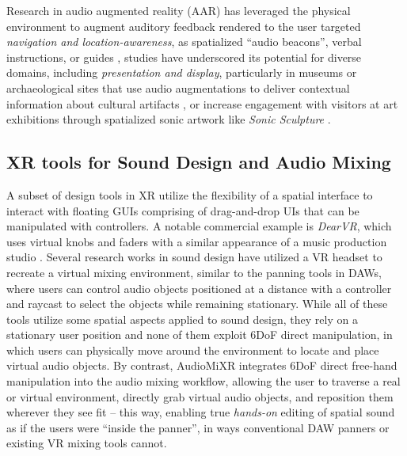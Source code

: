 Research in audio augmented reality (AAR) has leveraged the physical environment to augment auditory feedback rendered to the user targeted \emph{navigation and location-awareness}, as spatialized \enquote{audio beacons}, verbal instructions, or guides \cite{zoo_guide_2007, audio_stickies_2013}, studies have underscored its potential for diverse domains, including  \emph{presentation and display}, particularly in museums or archaeological sites that use audio augmentations to deliver contextual information about cultural artifacts \cite{Hatala2005, archeological2012}, or increase engagement with visitors at art exhibitions through spatialized sonic artwork like \emph{Sonic Sculpture} \cite{martin2020sonic}. 

\subsection{XR tools for Sound Design and Audio Mixing}
 A subset of design tools in XR utilize the flexibility of a spatial interface to interact with floating GUIs comprising of drag-and-drop UIs that can be manipulated with controllers. A notable commercial example is \emph{DearVR}, which uses virtual knobs and faders with a similar appearance of a music production studio \cite{dearvr2024}. Several research works in sound design \cite{jiang2023spatializing,bargum2023spatial} have utilized a VR headset to recreate a virtual mixing environment, similar to the panning tools in DAWs, where users can control audio objects positioned at a distance with a controller and raycast to select the objects while remaining stationary.%
 While all of these tools utilize some spatial aspects applied to sound design, they rely on a stationary user position and none of them exploit 6DoF direct manipulation, in which users can physically move around the environment to locate and place virtual audio objects. 
By contrast, AudioMiXR integrates 6DoF direct free-hand manipulation into the audio mixing workflow, allowing the user to traverse a real or virtual environment, directly grab virtual audio objects, and reposition them wherever they see fit -- this way, enabling true \emph{hands-on} editing of spatial sound as if the users were \enquote{inside the panner}, in ways conventional DAW panners or existing VR mixing tools cannot. 



